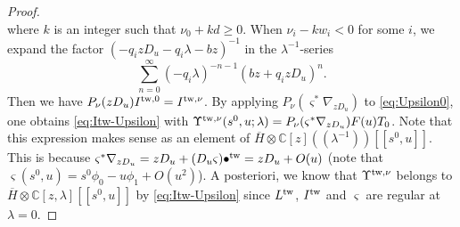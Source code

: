 \documentclass[11pt]{amsart}
\theoremstyle{definition} %
\theoremstyle{remark} %
\newcommand{\CC}{\mathbb C}
\newcommand{\tw}{{\rm tw}}
\newcommand{\ov}{\overline}
\begin{document}
\begin{proof}
\[\]
where $k$ is an integer such that $\nu_0 + kd \ge 0$. 
When $\nu_i - k w_i < 0$ for some $i$, we expand 
the factor $(-q_i z D_u -q_i \lambda - bz )^{-1}$ 
in the $\lambda^{-1}$-series 
\[
\sum_{n=0}^\infty (-q_i\lambda)^{-n-1} (bz + q_i zD_u)^n.  
\]
Then we have $P_\nu(z D_u) I^{\tw,0} = I^{\tw,\nu}$. 
By applying $P_\nu(\varsigma^* \nabla_{zD_u})$ 
to \eqref{eq:Upsilon0}, one obtains \eqref{eq:Itw-Upsilon}
with $\Upsilon^{\tw,\nu}(s^0,u;\lambda) = 
P_\nu(\varsigma^*\nabla_{z D_u}) F(u) T_0$. 
Note that this expression makes sense as an element of 
$\ov{H}\otimes \CC[z](\!(\lambda^{-1})\!)[\![s^0,u]\!]$. 
This is because $\varsigma^*\nabla_{zD_u} =z D_u + 
(D_u \varsigma)\bullet^\tw = z D_u + O(u)$ 
(note that $\varsigma(s^0,u) = s^0 \phi_0 - u \phi_1 + O(u^2)$). 
A posteriori, we know that 
$\Upsilon^{\tw,\nu}$ belongs to 
$\ov{H}\otimes \CC[z,\lambda][\![s^0,u]\!]$ 
by \eqref{eq:Itw-Upsilon} since 
$L^\tw$, $I^\tw$ and $\varsigma$ are regular at $\lambda=0$. 


\end{proof}
\end{document}
